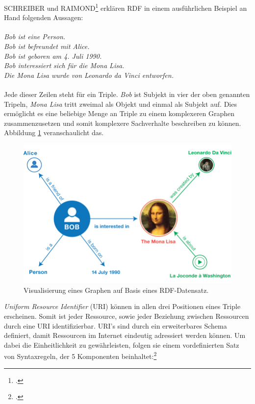 \documentclass[12pt,a4paper]{article}
\begin{document}
SCHREIBER und RAIMOND\footcite[Vgl.][]{schreiber2014rdf} erklären RDF in einem ausführlichen Beispiel an Hand folgenden Aussagen:
\\
\\
\textit{Bob ist eine Person.\\
Bob ist befreundet mit Alice.\\
Bob ist geboren am 4. Juli 1990. \\
Bob interessiert sich für die Mona Lisa.\\
Die Mona Lisa wurde von Leonardo da Vinci entworfen.}
\\
\\
Jede dieser Zeilen steht für ein Triple. \textit{Bob} ist Subjekt in vier der oben genannten Tripeln, \textit{Mona Lisa} tritt zweimal als Objekt und einmal als Subjekt auf. Dies ermöglicht es eine beliebige Menge an Triple zu einem komplexeren Graphen zusammenzusetzen und somit komplexere Sachverhalte beschreiben zu können. Abbildung \ref{fig:rdf_example} veranschaulicht das.
\begin{figure}[h]
  \centering
	\includegraphics[width=1\textwidth]{img/rdf_example.png}  
    \caption[Visualisierung eines Graphen auf Basis eines RDF-Datensatz, \protect\url{https://www.w3.org/TR/rdf11-primer/}, 10.04.2019.]{Visualisierung eines Graphen auf Basis eines RDF-Datensatz.}
  	\label{fig:rdf_example}
\end{figure}

\textit{Uniform Resource Identifier} (URI) können in allen drei Positionen eines Triple erscheinen. Somit ist jeder Ressource, sowie jeder Beziehung zwischen Ressourcen durch eine URI identifizierbar. URI's sind durch ein erweiterbares Schema definiert, damit Ressourcen im Internet eindeutig adressiert werden können. Um dabei die Einheitlichkeit zu gewährleisten, folgen sie einem vordefinierten Satz von Syntaxregeln, der 5 Komponenten beinhaltet:\footcite[Vgl.][]{berners2004uniform}
\end{document}
